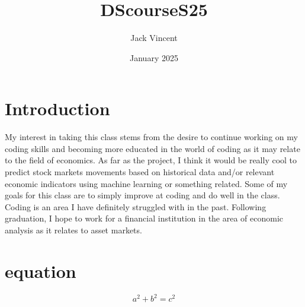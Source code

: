 \documentclass{article}
\title{DScourseS25}
\author{Jack Vincent}
\date{January 2025}
\begin{document}
\maketitle

\section{Introduction}
My interest in taking this class stems from the desire to continue working on my coding skills and becoming more educated in the world of coding as it may relate to the field of economics. As far as the project, I think it would be really cool to predict stock markets movements based on historical data and/or relevant economic indicators using machine learning or something related. Some of my goals for this class are to simply improve at coding and do well in the class. Coding is an area I have definitely struggled with in the past. Following graduation, I hope to work for a financial institution in the area of economic analysis as it relates to asset markets. 
\section{equation}
\begin{equation}
a^2+b^2=c^2
\end{equation}
\end{document}
